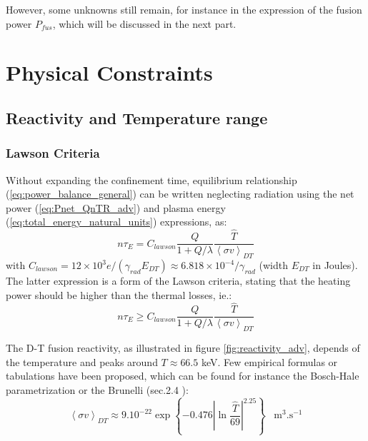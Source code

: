 However, some unknowns still remain, for instance in the expression of the fusion power $P_{fus}$, which will be discussed in the next part.

\newpage
\chapter{Physical Constraints}\margintoc
\section{Reactivity and Temperature range}
\subsection{Lawson Criteria}
Without expanding the confinement time, equilibrium relationship (\ref{eq:power_balance_general}) can be written neglecting radiation using the net power (\ref{eq:Pnet_QnTR_adv}) and plasma energy (\ref{eq:total_energy_natural_units}) expressions, as:
$$
n \tau_E 
=
C_{lawson}
\frac{Q}{1+Q/\lambda}
\frac{\hat T }{\left< \sigma v \right>_{DT} }
$$ 
with $C_{lawson} = 12\times10^3 e / (\gamma_{rad} E_{DT})\approx 6.818\times10^{-4}/\gamma_{rad}$ (width $E_{DT}$ in Joules). The latter expression is a form of the Lawson criteria, stating that the heating power should be higher than the thermal losses, ie.:
\begin{equation}
	n \tau_E 
	\geqslant
	C_{lawson}
	\frac{Q}{1+Q/\lambda}
	\frac{\hat T }{\left< \sigma v \right>_{DT} }
\label{eq:Lawson_criterium_temperature_adv}
\end{equation} 


The D-T fusion reactivity, as illustrated in figure \ref{fig:reactivity_adv}, depends of the temperature and peaks around $T \approx 66.5$ keV. Few empirical formulas or tabulations have been proposed, which can be found for instance the Bosch-Hale parametrization \cite[sec.9.8]{Hartwig2016} or the Brunelli (sec.2.4 ):
\begin{equation}
\left< \sigma v \right>_{DT} \approx 9.10^{-22}
\exp\left\{ -0.476 \left| \ln\frac{\hat T}{69} \right|^{2.25}\right\}
\;\;\;\textrm{m}^3.\textrm{s}^{-1}
\end{equation}
 
